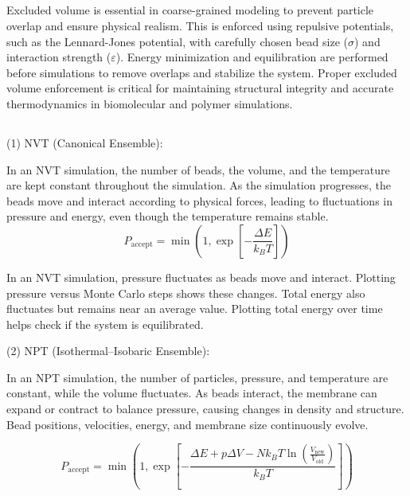 \documentclass[12pt]{article}
\begin{document}
\begin{flushleft}
  \subsection*{}
Excluded volume is essential in coarse-grained modeling to prevent particle overlap and ensure physical realism. This is enforced using repulsive potentials, such as the Lennard-Jones potential, with carefully chosen bead size ($\sigma$) and interaction strength ($\varepsilon$). Energy minimization and equilibration are performed before simulations to remove overlaps and stabilize the system. Proper excluded volume enforcement is critical for maintaining structural integrity and accurate thermodynamics in biomolecular and polymer simulations.

\subsection*{}

(1) NVT (Canonical Ensemble): 

In an NVT simulation, the number of beads, the volume, and the temperature are kept constant throughout the simulation.  As the simulation progresses, the beads move and interact according to physical forces, leading to fluctuations in pressure and energy, even though the temperature remains stable. 
\begin{equation}
P_{\text{accept}} = \min \left( 1, \exp\left[-\frac{\Delta E}{k_B T}\right] \right)
\end{equation}

In an NVT simulation, pressure fluctuates as beads move and interact. Plotting pressure versus Monte Carlo steps shows these changes. Total energy also fluctuates but remains near an average value. Plotting total energy over time helps check if the system is equilibrated.
   
   

(2) NPT (Isothermal–Isobaric Ensemble): 

In an NPT simulation, the number of particles, pressure, and temperature are constant, while the volume fluctuates. As beads interact, the membrane can expand or contract to balance pressure, causing changes in density and structure. Bead positions, velocities, energy, and membrane size continuously evolve.
        
\begin{equation}
P_{\text{accept}} = \min \left( 1, \exp \left[ - \frac{\Delta E + p \Delta V - N k_B T \ln \left( \frac{V_{\text{new}}}{V_{\text{old}}} \right)}{k_B T} \right] \right)
\end{equation}
 

\end{flushleft}
\end{document}

